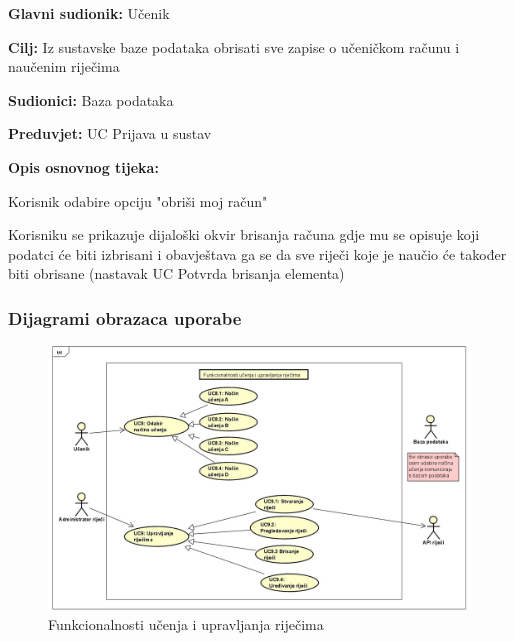 					\noindent {}
					\begin{packed_item}

						\item \textbf{Glavni sudionik: } Učenik
						\item \textbf{Cilj: } Iz sustavske baze podataka obrisati sve zapise o 
						učeničkom računu i naučenim riječima
						\item \textbf{Sudionici: } Baza podataka
						\item \textbf{Preduvjet: } UC Prijava u sustav
						\item  \textbf{Opis osnovnog tijeka:} 
						
						\item[] \begin{packed_enum}

							\item Korisnik odabire opciju "obriši moj račun"
							\item Korisniku se prikazuje dijaloški okvir brisanja računa gdje mu se opisuje koji podatci će biti izbrisani i obavještava ga se da sve riječi koje je naučio će također biti obrisane (nastavak UC Potvrda brisanja elementa)
						
						\end{packed_enum}

					\end{packed_item}

					\eject

					
					\subsubsection{Dijagrami obrazaca uporabe}
					
					\begin{figure}[H]
						\includegraphics[scale=0.30]{dijagrami/dijagram1.jpg} 
						\centering
						\caption{Funkcionalnosti učenja i upravljanja riječima}
						\label{fig:dijagram1}
					\end{figure}
					
